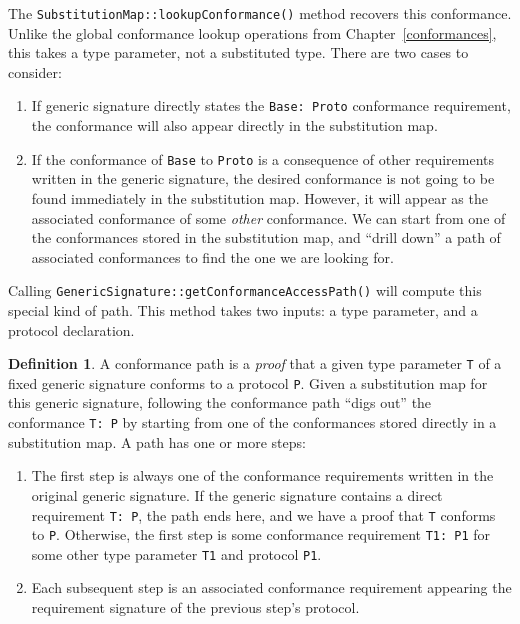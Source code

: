 \documentclass[a4paper,headsepline,bibliography=totoc,toc=flat,fleqn,twoside=semi]{scrbook}
\theoremstyle{definition}
\newtheorem{definition}{Definition}[chapter]
\theoremstyle{definition}
\theoremstyle{definition}
\begin{document}
The \texttt{SubstitutionMap::lookupConformance()} method recovers this conformance. Unlike the global conformance lookup operations from Chapter~\ref{conformances}, this takes a type parameter, not a substituted type. There are two cases to consider:
\begin{enumerate}
\item If generic signature directly states the \texttt{Base:\ Proto} conformance requirement, the conformance will also appear directly in the substitution map.
\item If the conformance of \texttt{Base} to \texttt{Proto} is a consequence of other requirements written in the generic signature, the desired conformance is not going to be found immediately in the substitution map. However, it will appear as the associated conformance of some \emph{other} conformance. We can start from one of the conformances stored in the substitution map, and ``drill down'' a path of associated conformances to find the one we are looking for.
\end{enumerate}

Calling \texttt{GenericSignature::getConformanceAccessPath()} will compute this special kind of path. This method takes two inputs: a type parameter, and a protocol declaration.

\begin{definition}
A conformance path is a \emph{proof} that a given type parameter \texttt{T} of a fixed generic signature conforms to a protocol \texttt{P}. Given a substitution map for this generic signature, following the conformance path ``digs out'' the conformance \texttt{T:\ P} by starting from one of the conformances stored directly in a substitution map. A path has one or more steps:
\begin{enumerate}
\item The first step is always one of the conformance requirements written in the original generic signature. If the generic signature contains a direct requirement \texttt{T:\ P}, the path ends here, and we have a proof that \texttt{T} conforms to \texttt{P}. Otherwise, the first step is some conformance requirement \texttt{T1:\ P1} for some other type parameter \texttt{T1} and protocol \texttt{P1}.
\item Each subsequent step is an associated conformance requirement appearing the requirement signature of the previous step's protocol.
\end{enumerate}
\end{definition}
\end{document}
